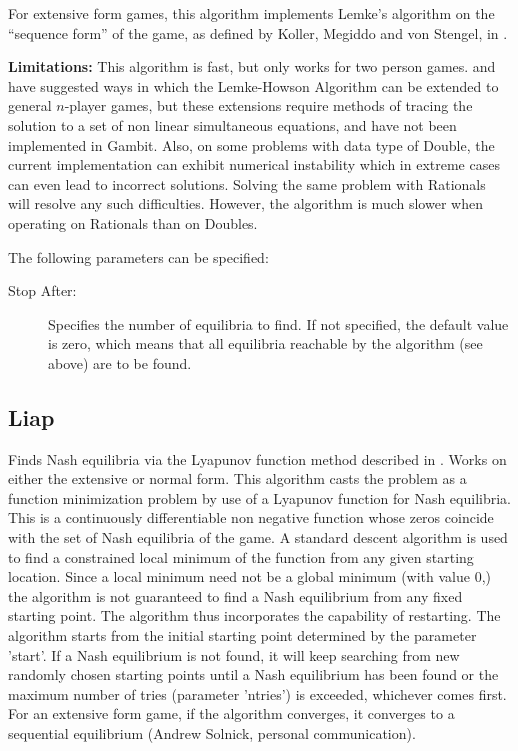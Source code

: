\documentclass[12pt]{report}
\begin{document}
For extensive form games, this algorithm implements Lemke's algorithm
on the ``sequence form'' of the game, as defined by Koller, Megiddo
and von Stengel, in \cite{KolMegSte:94}.

{\bf Limitations:} This algorithm is fast, but only works for two
person games.  \cite{Wilson:1971} and \cite{Rosenmuller:1971} have
suggested ways in which the Lemke-Howson Algorithm can be extended to
general $n$-player games, but these extensions require methods of
tracing the solution to a set of non linear simultaneous equations,
and have not been implemented in Gambit.  Also, on some problems with
data type of Double, the current implementation can exhibit numerical
instability which in extreme cases can even lead to incorrect
solutions.  Solving the same problem with Rationals will resolve any
such difficulties.  However, the algorithm is much slower when
operating on Rationals than on Doubles.

The following parameters can be specified:

\begin{description}
\item[Stop After:] Specifies the number of equilibria to find.  If not
specified, the default value is zero, which means that all equilibria
reachable by the algorithm (see above) are to be found.
\end{description}

\subsection{Liap}\label{Liap}
Finds Nash equilibria via the Lyapunov function method
described in \cite{McK:91}.  Works on either the extensive or normal
form.  This algorithm casts the problem as a function minimization
problem by use of a Lyapunov function for Nash equilibria.  This is a
continuously differentiable non negative function whose zeros coincide
with the set of Nash equilibria of the game.  A standard descent
algorithm is used to find a constrained local minimum of the function
from any given starting location.  Since a local minimum need not be a
global minimum (with value 0,) the algorithm is not guaranteed to find
a Nash equilibrium from any fixed starting point.  The algorithm thus
incorporates the capability of restarting.  The algorithm starts from
the initial starting point determined by the parameter 'start'.  If a
Nash equilibrium is not found, it will keep searching from new
randomly chosen starting points until a Nash equilibrium has been
found or the maximum number of tries (parameter 'ntries') is exceeded,
whichever comes first.  For an extensive form game, if the algorithm
converges, it converges to a sequential equilibrium (Andrew Solnick,
personal communication).
\end{document}
